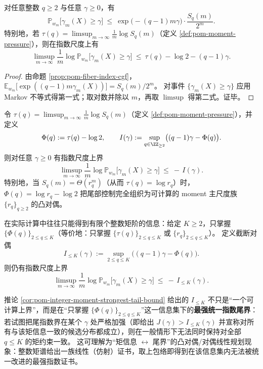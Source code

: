 \begin{proposition}\label{prop:pom-quantile-chernoff}
对任意整数 \(q\ge 2\) 与任意 \(\gamma\ge 0\)，有
$$
\mathbb{P}_{w_m}\big[\gamma_m(X)\ge \gamma\big]
\ \le\
\exp\!\bigl(-(q-1)m\gamma\bigr)\cdot \frac{S_q(m)}{2^m}.
$$
特别地，若 \(\tau(q)=\limsup_{m\to\infty}\frac{1}{m}\log S_q(m)\)（定义 \ref{def:pom-moment-pressure}），则在指数尺度上有
$$
\limsup_{m\to\infty}\frac{1}{m}\log \mathbb{P}_{w_m}\big[\gamma_m(X)\ge \gamma\big]
\ \le\
\tau(q)-\log 2-(q-1)\gamma.
$$
\end{proposition}

\begin{proof}
由命题 \ref{prop:pom-fiber-index-cgf}，
\(
\mathbb{E}_{w_m}\big[\exp((q-1)m\gamma_m(X))\big]=S_q(m)/2^m
\)。
对事件 \(\{\gamma_m(X)\ge\gamma\}\) 应用 Markov 不等式得第一式；取对数并除以 \(m\)，再取 \(\limsup\) 得第二式。证毕。
\end{proof}

\begin{corollary}\label{cor:pom-quantile-dual-optimizer}
令 \(\tau(q)=\limsup_{m\to\infty}\frac{1}{m}\log S_q(m)\)（定义 \ref{def:pom-moment-pressure}），并定义
\[
\Phi(q):=\tau(q)-\log 2,
\qquad
I(\gamma):=\sup_{q\in\ZZ_{\ge 2}}\bigl((q-1)\gamma-\Phi(q)\bigr).
\]
则对任意 \(\gamma\ge 0\) 有指数尺度上界
\[
\limsup_{m\to\infty}\frac{1}{m}\log \mathbb{P}_{w_m}\big[\gamma_m(X)\ge \gamma\big]
\ \le\ -\,I(\gamma).
\]
特别地，当 \(S_q(m)=\Theta(r_q^m)\)（从而 \(\tau(q)=\log r_q\)）时，
\(
\Phi(q)=\log r_q-\log 2
\)
把尾部控制完全组织为可计算的 moment 主尺度族 \(\{r_q\}_{q\ge 2}\) 的凸对偶。
\end{corollary}

\begin{corollary}\label{cor:pom-integer-moment-strongest-tail-bound}\label{cor:pom-best-computable-tail-bound-integer-moments}
在实际计算中往往只能得到有限个整数矩阶的信息：给定 \(K\ge 2\)，只掌握 \(\{\Phi(q)\}_{2\le q\le K}\)（等价地：只掌握 \(\{\tau(q)\}_{2\le q\le K}\) 或 \(\{r_q\}_{2\le q\le K}\)）。
定义截断对偶
\[
I_{\le K}(\gamma):=\sup_{2\le q\le K}\bigl((q-1)\gamma-\Phi(q)\bigr).
\]
则仍有指数尺度上界
\[
\limsup_{m\to\infty}\frac{1}{m}\log \mathbb{P}_{w_m}\big[\gamma_m(X)\ge \gamma\big]
\ \le\ -\,I_{\le K}(\gamma).
\]
\end{corollary}

\begin{remark}\label{rem:pom-integer-moment-tail-optimality}
推论 \ref{cor:pom-integer-moment-strongest-tail-bound} 给出的 \(I_{\le K}\) 不只是“一个可计算上界”，而是在“只掌握 \(\{\Phi(q)\}_{2\le q\le K}\)”这一信息集下的\textbf{最强统一指数尾界}：
若试图把尾指数界在某个 \(\gamma\) 处严格加强（即给出 \(J(\gamma)>I_{\le K}(\gamma)\) 并宣称对所有与该矩信息一致的候选分布都成立），则在一般情形下无法同时保持对全部 \(q\le K\) 的矩约束一致。
这可理解为“矩信息 \(\leftrightarrow\) 尾界”的凸对偶/对偶线性规划现象：整数矩谱给出一族线性（仿射）证书，取上包络即得到在该信息集内无法被统一改进的最强指数证书。
\end{remark}


